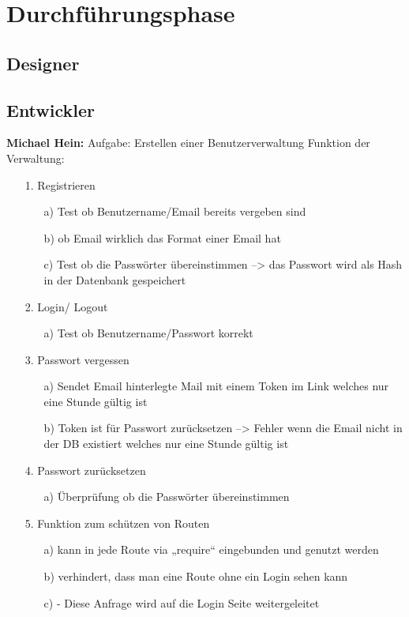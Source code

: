 \documentclass[12pt,a4paper]{article}
\begin{document}
\newpage

\section{Durchführungsphase}

\subsection{Designer}

\newpage
\subsection{Entwickler}
\textbf{Michael Hein:}
\newline
Aufgabe: Erstellen einer Benutzerverwaltung
\newline
Funktion der Verwaltung:
\begin{itemize}
\item[1.]Registrieren
\begin{itemize}
        \item[a)]Test ob Benutzername/Email bereits vergeben sind
        \item[b)] ob Email wirklich das Format einer Email hat
        \item[c)]Test ob die Passwörter übereinstimmen --> das Passwort wird als Hash in der  Datenbank gespeichert
\end{itemize}
\item[2.]Login/ Logout
\begin{itemize}
\item[a)]Test ob Benutzername/Passwort korrekt
\end{itemize}
\item[3.]Passwort vergessen 
\begin{itemize}
 \item[a)] Sendet Email hinterlegte Mail mit einem Token im Link welches nur eine Stunde gültig ist
\item[b)]Token ist für Passwort zurücksetzen --> Fehler wenn die Email nicht in der DB existiert welches nur eine Stunde gültig ist
\end{itemize}
\item[4.]Passwort zurücksetzen
\begin{itemize}
\item[a)]Überprüfung ob die Passwörter übereinstimmen
\end{itemize}
\item[5.]Funktion zum schützen von Routen
\begin{itemize}
\item[a)]kann in jede Route via „require“ eingebunden und genutzt werden
\item[b)]verhindert, dass man eine Route ohne ein Login sehen kann
 \item[c)]- Diese Anfrage wird auf die Login Seite weitergeleitet
\end{itemize}
\end{itemize}
\end{document}
